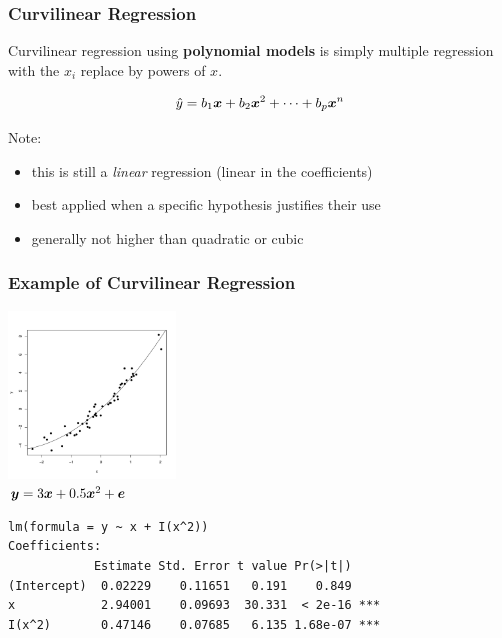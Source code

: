 \documentclass{beamer}
\begin{document}
\begin{frame}
  \frametitle{Curvilinear Regression}

Curvilinear regression using \textbf{polynomial models} is simply multiple regression with the $x_i$ replace by powers of $x$.
\bigskip

$$
\hat{y} = b_1\bm{x} + b_2\bm{x}^2 + \cdots + b_p\bm{x}^n
$$

\medskip

Note:
\begin{itemize}
	\item this is still a \emph{linear} regression (linear in the coefficients)
	\item best applied when a specific hypothesis justifies their use
	\item generally not higher than quadratic or cubic
\end{itemize}

\end{frame}
\begin{frame}[fragile]
  \frametitle{Example of Curvilinear Regression}

\begin{center}
\includegraphics[height=1.75in]{curvilinear-regression.pdf}\\
 $\bm{y} = 3\bm{x} + 0.5\bm{x}^2 + \bm{e}$
\end{center}

\begin{verbatim}
lm(formula = y ~ x + I(x^2))
Coefficients:
            Estimate Std. Error t value Pr(>|t|)
(Intercept)  0.02229    0.11651   0.191    0.849
x            2.94001    0.09693  30.331  < 2e-16 ***
I(x^2)       0.47146    0.07685   6.135 1.68e-07 ***
\end{verbatim}


\end{frame}
\end{document}
